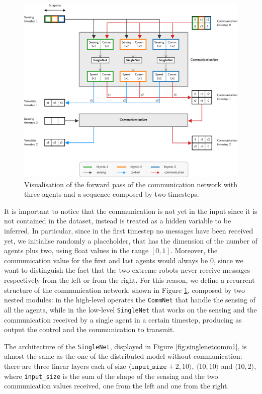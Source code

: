 \begin{figure}[htb]
	\centering
	\includegraphics[width=\textwidth]{contents/images/commnet}
	\caption[Communication network.]{Visualisation of the forward pass of the 
	communication network with three agents and a sequence composed by two 
	timesteps.}
	\label{fig:commnet1}
\end{figure}

It is important to notice that the communication is not yet in the input since it is 
not contained in the dataset, instead is treated as a hidden variable to be inferred. 
In particular, since in the first timestep no messages have been received yet, we 
initialise randomly a placeholder, that has the dimension of the number of agents 
plus two, using float values in the range $[0, 1]$. 
Moreover, the communication value for the first and last agents would always be 
$0$, since we want to distinguish the fact that the two extreme robots never 
receive messages respectively from the left or from the right.
For this reason, we define a recurrent structure of the communication network, 
shown in Figure \ref{fig:commnet1}, composed by two nested modules: in the 
high-level operates the \texttt{CommNet} that handle the sensing of all the 
agents, while in the low-level \texttt{SingleNet} that works on the sensing and the 
communication received by a single agent in a certain timestep, producing as 
output the control and the communication to transmit. 

The architecture of the \texttt{SingleNet}, displayed in Figure 
\ref{fig:singlenetcomm1}, is almost the same as the one of the distributed model 
without communication: there are three linear layers each of size 
$\langle\mathtt{input\_size} + 2, 10\rangle$,  $\langle 10, 
10\rangle$ and $\langle 10, 2\rangle$, where \texttt{input\_size} is the sum of 
the shape of the sensing and the two communication values received, one from 
the left and one from the right.

